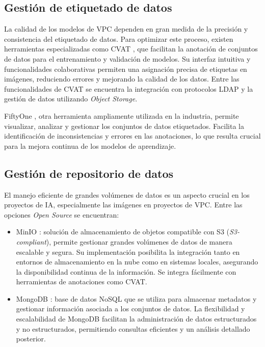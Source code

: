 \subsection{Gestión de etiquetado de datos}

La calidad de los modelos de VPC dependen en gran medida de la precisión y consistencia del etiquetado de datos. Para optimizar este proceso, existen herramientas especializadas como CVAT \citep{sekachev_opencvcvat_2020}, que facilitan la anotación de conjuntos de datos para el entrenamiento y validación de modelos. Su interfaz intuitiva y funcionalidades colaborativas permiten una asignación precisa de etiquetas en imágenes, reduciendo errores y mejorando la calidad de los datos. Entre las funcionalidades de CVAT se encuentra la integración con protocolos LDAP y la gestión de datos utilizando \textit{Object Storage}.

FiftyOne \citep{moore_fiftyone_2020}, otra herramienta ampliamente utilizada en la industria, permite visualizar, analizar y gestionar los conjuntos de datos etiquetados. Facilita la identificación de inconsistencias y errores en las anotaciones, lo que resulta crucial para la mejora continua de los modelos de aprendizaje.

\subsection{Gestión de repositorio de datos}

El manejo eficiente de grandes volúmenes de datos es un aspecto crucial en los proyectos de IA, especialmente las imágenes en proyectos de VPC. Entre las opciones \textit{Open Source} se encuentran:

\begin{itemize}
	\item MinIO \citep{minio_inc_minio_2023}: solución de almacenamiento de objetos compatible con S3 \citep{amazon_amazon_2024} (\textit{S3-compliant}), permite gestionar grandes volúmenes de datos de manera escalable y segura. Su implementación posibilita la integración tanto en entornos de almacenamiento en la nube como en sistemas locales, asegurando la disponibilidad continua de la información. Se integra fácilmente con herramientas de anotaciones como CVAT.
	\item MongoDB \citep{mongodb_inc_mongodb_2023}: base de datos NoSQL que se utiliza para almacenar metadatos y gestionar información asociada a los conjuntos de datos. La flexibilidad y escalabilidad de MongoDB facilitan la administración de datos estructurados y no estructurados, permitiendo consultas eficientes y un análisis detallado posterior.
\end{itemize}

